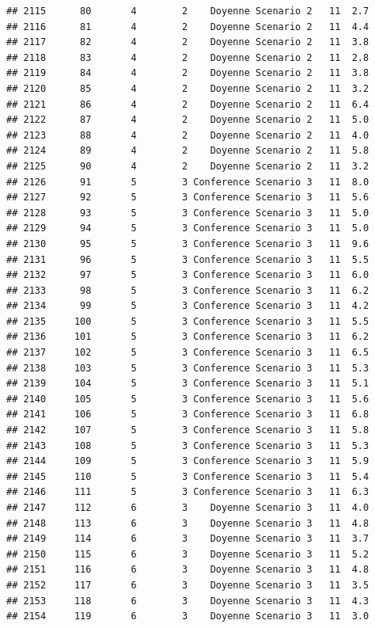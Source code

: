 \documentclass[
]{article}
\begin{document}
\begin{verbatim}
## 2115      80       4        2    Doyenne Scenario 2   11  2.7
## 2116      81       4        2    Doyenne Scenario 2   11  4.4
## 2117      82       4        2    Doyenne Scenario 2   11  3.8
## 2118      83       4        2    Doyenne Scenario 2   11  2.8
## 2119      84       4        2    Doyenne Scenario 2   11  3.8
## 2120      85       4        2    Doyenne Scenario 2   11  3.2
## 2121      86       4        2    Doyenne Scenario 2   11  6.4
## 2122      87       4        2    Doyenne Scenario 2   11  5.0
## 2123      88       4        2    Doyenne Scenario 2   11  4.0
## 2124      89       4        2    Doyenne Scenario 2   11  5.8
## 2125      90       4        2    Doyenne Scenario 2   11  3.2
## 2126      91       5        3 Conference Scenario 3   11  8.0
## 2127      92       5        3 Conference Scenario 3   11  5.6
## 2128      93       5        3 Conference Scenario 3   11  5.0
## 2129      94       5        3 Conference Scenario 3   11  5.0
## 2130      95       5        3 Conference Scenario 3   11  9.6
## 2131      96       5        3 Conference Scenario 3   11  5.5
## 2132      97       5        3 Conference Scenario 3   11  6.0
## 2133      98       5        3 Conference Scenario 3   11  6.2
## 2134      99       5        3 Conference Scenario 3   11  4.2
## 2135     100       5        3 Conference Scenario 3   11  5.5
## 2136     101       5        3 Conference Scenario 3   11  6.2
## 2137     102       5        3 Conference Scenario 3   11  6.5
## 2138     103       5        3 Conference Scenario 3   11  5.3
## 2139     104       5        3 Conference Scenario 3   11  5.1
## 2140     105       5        3 Conference Scenario 3   11  5.6
## 2141     106       5        3 Conference Scenario 3   11  6.8
## 2142     107       5        3 Conference Scenario 3   11  5.8
## 2143     108       5        3 Conference Scenario 3   11  5.3
## 2144     109       5        3 Conference Scenario 3   11  5.9
## 2145     110       5        3 Conference Scenario 3   11  5.4
## 2146     111       5        3 Conference Scenario 3   11  6.3
## 2147     112       6        3    Doyenne Scenario 3   11  4.0
## 2148     113       6        3    Doyenne Scenario 3   11  4.8
## 2149     114       6        3    Doyenne Scenario 3   11  3.7
## 2150     115       6        3    Doyenne Scenario 3   11  5.2
## 2151     116       6        3    Doyenne Scenario 3   11  4.8
## 2152     117       6        3    Doyenne Scenario 3   11  3.5
## 2153     118       6        3    Doyenne Scenario 3   11  4.3
## 2154     119       6        3    Doyenne Scenario 3   11  3.0

\end{verbatim}
\end{document}
